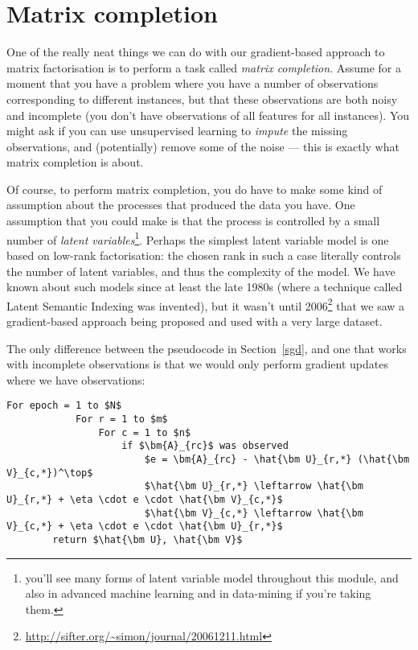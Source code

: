 \documentclass[a4paper]{article}
\begin{document}
\section{Matrix completion}
One of the really neat things we can do with our gradient-based approach to matrix factorisation is to perform a task called \emph{matrix completion}. Assume for a moment that you have a problem where you have a number of observations corresponding to different instances, but that these observations are both noisy and incomplete (you don't have observations of all features for all instances). You might ask if you can use unsupervised learning to \emph{impute} the missing observations, and (potentially) remove some of the noise --- this is exactly what matrix completion is about. 

Of course, to perform matrix completion, you do have to make some kind of assumption about the processes that produced the data you have. One assumption that you could make is that the process is controlled by a small number of \emph{latent variables}\footnote{you'll see many forms of latent variable model throughout this module, and also in advanced machine learning and in data-mining if you're taking them.}. Perhaps the simplest latent variable model is one based on low-rank  factorisation: the chosen rank in such a case literally controls the number of latent variables, and thus the complexity of the model. We have known about such models since at least the late 1980s (where a technique called Latent Semantic Indexing was invented), but it wasn't until 2006\footnote{\url{http://sifter.org/~simon/journal/20061211.html}} that we saw a gradient-based approach being proposed and used with a very large dataset. 

The only difference between the pseudocode in Section~\ref{sgd}, and one that works with incomplete observations is that we would only perform gradient updates where we have observations:

\begin{lstlisting}[mathescape=true,tabsize=4]
		For epoch = 1 to $N$
			For r = 1 to $m$
				For c = 1 to $n$
					if $\bm{A}_{rc}$ was observed
						$e = \bm{A}_{rc} - \hat{\bm U}_{r,*} (\hat{\bm V}_{c,*})^\top$
						$\hat{\bm U}_{r,*} \leftarrow \hat{\bm U}_{r,*} + \eta \cdot e \cdot \hat{\bm V}_{c,*}$
						$\hat{\bm V}_{c,*} \leftarrow \hat{\bm V}_{c,*} + \eta \cdot e \cdot \hat{\bm U}_{r,*}$
		return $\hat{\bm U}, \hat{\bm V}$
\end{lstlisting}
\end{document}
